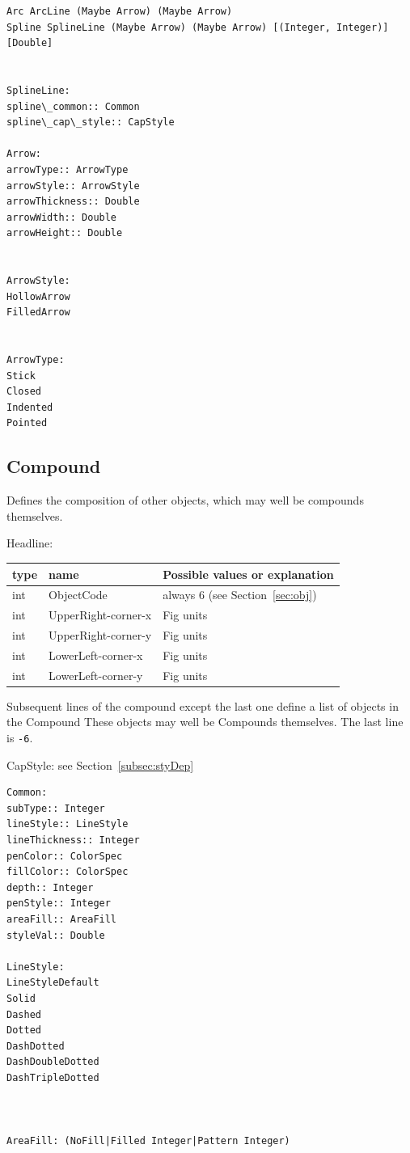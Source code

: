 \documentclass[10pt, a4paper, english]{article}%
\begin{document}
\begin{verbatim}
Arc ArcLine (Maybe Arrow) (Maybe Arrow)	 
Spline SplineLine (Maybe Arrow) (Maybe Arrow) [(Integer, Integer)] [Double]


SplineLine:
spline\_common:: Common
spline\_cap\_style:: CapStyle

Arrow:
arrowType:: ArrowType
arrowStyle:: ArrowStyle
arrowThickness:: Double
arrowWidth:: Double
arrowHeight:: Double


ArrowStyle:
HollowArrow	 
FilledArrow	 


ArrowType:
Stick	 
Closed	 
Indented	 
Pointed	 
\end{verbatim}

 
\subsection{Compound}\label{subsec:compound}

Defines the composition of other objects, 
which may well be compounds themselves. 

\noindent
Headline: \\
%
\begin{tabular}{lll}
\toprule
type & name & Possible values or explanation \\
\midrule
\midrule
int & ObjectCode          & always 6 (see Section~\ref{sec:obj}) \\
int & UpperRight-corner-x & Fig units \\
int & UpperRight-corner-y & Fig units \\
int & LowerLeft-corner-x  & Fig units \\
int & LowerLeft-corner-y  & Fig units \\
\bottomrule
\end{tabular}

Subsequent lines of the compound except the last one 
define a list of objects in the Compound
These objects may well be Compounds themselves. 
The last line is \texttt{-6}. 



CapStyle: see Section~\ref{subsec:styDep}







\begin{verbatim}
Common:
subType:: Integer
lineStyle:: LineStyle
lineThickness:: Integer
penColor:: ColorSpec
fillColor:: ColorSpec
depth:: Integer
penStyle:: Integer
areaFill:: AreaFill
styleVal:: Double

LineStyle:
LineStyleDefault	 
Solid	 
Dashed	 
Dotted	 
DashDotted	 
DashDoubleDotted	 
DashTripleDotted	 



AreaFill: (NoFill|Filled Integer|Pattern Integer)
\end{verbatim}
\end{document}
